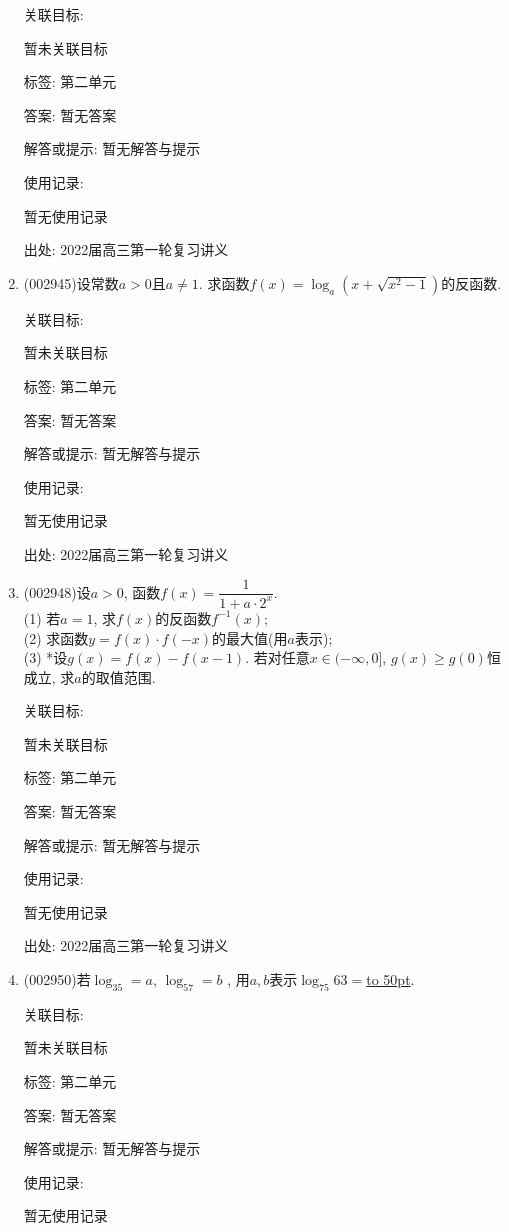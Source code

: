 \documentclass[10pt,a4paper]{article}
\newcommand{\blank}[1]{\underline{\hbox to #1pt{}}}
\begin{document}
\begin{enumerate}[1.]
关联目标:

暂未关联目标



标签: 第二单元

答案: 暂无答案

解答或提示: 暂无解答与提示

使用记录:

暂无使用记录


出处: 2022届高三第一轮复习讲义
\item { (002945)}设常数$a>0$且$a\ne 1$. 求函数$f(x)=\log_a(x+\sqrt{x^2-1})$的反函数.


关联目标:

暂未关联目标



标签: 第二单元

答案: 暂无答案

解答或提示: 暂无解答与提示

使用记录:

暂无使用记录


出处: 2022届高三第一轮复习讲义
\item { (002948)}设$a>0$, 函数$f(x)=\dfrac 1{1+a\cdot 2^x}$.\\
(1) 若$a=1$, 求$f(x)$的反函数$f^{-1}(x)$;\\
(2) 求函数$y=f(x)\cdot f(-x)$的最大值(用$a$表示);\\
(3) *设$g(x)=f(x)-f(x-1)$. 若对任意$x\in (-\infty ,0]$, $g(x)\ge g(0)$恒成立, 求$a$的取值范围.


关联目标:

暂未关联目标



标签: 第二单元

答案: 暂无答案

解答或提示: 暂无解答与提示

使用记录:

暂无使用记录


出处: 2022届高三第一轮复习讲义
\item { (002950)}若$\log_35=a$, $\log_57=b$ , 用$a,b$表示$\log_{75}63=$\blank{50}.


关联目标:

暂未关联目标



标签: 第二单元

答案: 暂无答案

解答或提示: 暂无解答与提示

使用记录:

暂无使用记录



\end{enumerate}
\end{document}
